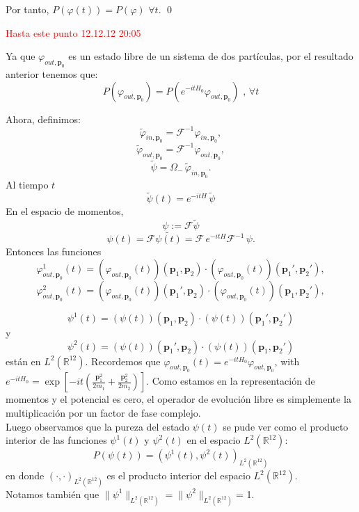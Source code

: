 \documentclass[12pt]{book}
\numberwithin{equation}{chapter}
\def\R{\mathbb{R}}
\def\vp{\varphi}
\def\P{\mathbf{p}}
\begin{document}
Por tanto, $P(\vp(t))=P(\vp)$ $\forall t$. \qed

\vspace{5 mm}
\textcolor{red}{Hasta este punto 12.12.12  20:05}

Ya que $\vp_{out,\P_{0}}$ es un estado libre de un sistema de dos part\'iculas, por el resultado anterior tenemos que:
$$ P(\vp_{out,\P_{0}})= P \left( e^{-itH_{0}} \vp_{out,\P_{0}} \right) \,\,,\, \forall t$$

Ahora, definimos:
$$
\tilde{\vp}_{in, \P_0}= \mathcal F^{-1} \vp_{in, \P_0},
$$
$$
\tilde{\vp}_{out, \P_0}= \mathcal F^{-1} \vp_{out, \P_0},
$$
$$
\tilde{\psi}= \Omega_-\, \tilde{\vp}_{in, \P_0}.
$$
Al tiempo $t$
$$
\tilde{\psi}(t)= e^{-i tH} \, \tilde{\psi}
$$
En el espacio de momentos,
$$
\psi:= \mathcal F \tilde{\psi}
$$
$$
\psi(t)= \mathcal F \tilde{\psi(t)}= \mathcal F \,e^{-it H} \mathcal F^{-1}\, \psi.
$$
Entonces las funciones
$$ \vp_{out,\P_{0}}^{1}(t)= (\vp_{out,\P_{0}}(t))(\P_{1},\P_{2}) \cdot (\vp_{out,\P_{0}}(t))(\P_{1}',\P_{2}'),
 $$
$$ 
\vp_{out,\P_{0}}^{2}(t)= (\vp_{out,\P_{0}}(t))(\P_{1}',\P_{2}) \cdot (\vp_{out,\P_{0}}(t))(\P_{1},\P_{2}'), 
$$

\begin{equation}\label{psi-1}
\psi^{1}(t)= (\psi(t))(\P_{1},\P_{2}) \cdot (\psi(t))(\P_{1}',\P_{2}')
\end{equation}
y
\begin{equation}\label{psi-2}
\psi^{2}(t)= (\psi(t))(\P_{1}',\P_{2}) \cdot (\psi(t))(\P_{1},\P_{2}')
\end{equation}
est\'an en $L^{2}(\R^{12})$. Recordemos  que $\vp_{out,\P_0}(t)=e^{-itH_{0}} \vp_{out, \P_0}$, with
$ e^{-itH_{0}}= \exp \left[-it \left( \frac{\P_{1}^{2}}{2m_{1}}+
 \frac{\P_{2}^{2}}{2m_{2}} \right) \right]  $.
Como  estamos en la representaci\'on de momentos y el potencial es cero, el operador de evoluci\'on libre es simplemente la multiplicaci\'on por un factor de fase complejo.\\


Luego observamos que la pureza del estado $\psi(t)$ se pude ver como el producto interior de las funciones $\psi^{1}(t)$ y $\psi^{2}(t)$ en el espacio $L^{2}(\R^{12})$:
\begin{equation}\label{pur-z}
P(\psi(t))= (\psi^{1}(t),\psi^{2}(t))_{L^{2}(\R^{12})}
\end{equation}
en donde $(\cdot,\cdot )_{L^{2}(\R^{12})}$ es el producto interior del espacio $L^{2}(\R^{12})$.\\ 
Notamos tambi\'en que $\| \psi^{1} \|_{L^{2}(\R^{12})}=\| \psi^{2} \|_{L^{2}(\R^{12})}$= 1.\\
\end{document}
